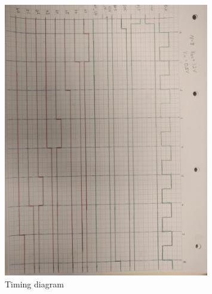 \documentclass[english, 12pt, a4paper]{article}
\begin{document}
\begin{figure}[!ht]
  \centering
    \includegraphics[width=0.8\textwidth]{timing_diagram_color.jpg}
    \caption{Timing diagram}
    \label{timing}
\end{figure}
\end{document}
